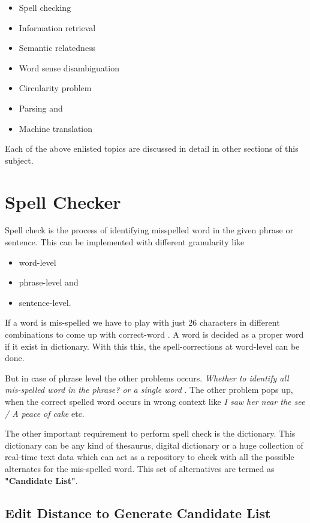 \documentclass{bmcart}
\begin{document}
\begin{itemize}
\item Spell checking
\item Information retrieval
\item Semantic relatedness
\item Word sense disambiguation
\item Circularity problem
\item Parsing and
\item Machine translation
\end{itemize}

Each of the above enlisted topics are discussed in detail in other sections of this subject.

\section{Spell Checker}
\label{sec:SpellCheck}

Spell check is the process of identifying misspelled word in the given phrase or sentence. This
can be implemented with different granularity like
\begin{itemize}
\item word-level
\item phrase-level and
\item sentence-level.
\end{itemize}

If a word is mis-spelled we have to play with just 26 characters in different combinations to come up with correct-word \cite{spellCheckSurvey}. A word is decided as a proper word if it exist in dictionary. With this this, the spell-corrections at word-level can be done.

But in case of phrase level the other problems occurs. {\it {Whether to identify all mis-spelled
word in the phrase?} or {\it a single word} }. The other problem pops up, when the correct spelled word occurs in wrong context like {\emph{I saw her near the see / A peace of cake}} etc.

The other important requirement to perform spell check is the dictionary. This dictionary can be any kind of thesaurus, digital dictionary or a huge collection of real-time text data which can act as a repository to check with all the possible alternates for the mis-spelled word. This set of alternatives are termed as {\bf "Candidate List"}.

\subsection{Edit Distance to Generate Candidate List}
\label{ssec:editDistance}
\end{document}

